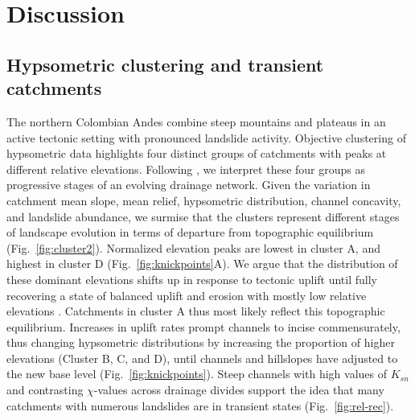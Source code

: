 \documentclass[draft]{agujournal2019}
\begin{document}
\section{Discussion}

\subsection{Hypsometric clustering and transient catchments}

\par The northern Colombian Andes combine steep mountains and plateaus in an active tectonic setting with pronounced landslide activity. Objective clustering of hypsometric data highlights four distinct groups of catchments with peaks at different relative elevations. Following , we interpret these four groups as progressive stages of an evolving drainage network. Given the variation in catchment mean slope, mean relief, hypsometric distribution, channel concavity, and landslide abundance, we surmise that the clusters represent different stages of landscape evolution in terms of departure from topographic equilibrium (Fig.~\ref{fig:cluster2}). Normalized elevation peaks are lowest in cluster A, and highest in cluster D (Fig.~\ref{fig:knickpoints}A). We argue that the distribution of these dominant elevations shifts up in response to tectonic uplift until fully recovering a state of balanced uplift and erosion with mostly low relative elevations \cite{Gallen2011}. Catchments in cluster A thus most likely reflect this topographic equilibrium. Increases in uplift rates prompt channels to incise commensurately, thus changing hypsometric distributions by increasing the proportion of higher elevations (Cluster B, C, and D), until channels and hillslopes have adjusted to the new base level (Fig.~\ref{fig:knickpoints}). Steep channels with high values of $K_{sn}$ and contrasting $\chi$-values across drainage divides support the idea that many catchments with numerous landslides are in transient states (Fig.~\ref{fig:rel-rec}).
\end{document}
